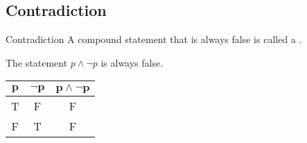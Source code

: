 \documentclass[\main/notes.tex]{subfiles}
\begin{document}
			\subsection{Contradiction}
				\begin{definition}[width=0.75\textwidth]{Contradiction}
					A compound statement that is always false is called a .
				\end{definition}
				\begin{example}[width=0.55\textwidth]
					The statement $p \land \lnot p$ is always false.
					\begin{center}
						\begin{tabular}{| c c | c |}
							\hline
							$\mathbf{p}$ & $\mathbf{\lnot p}$ & $\mathbf{p \land \lnot p}$\\
							\hline
							T & F & F\\
							F & T & F\\
							\hline
						\end{tabular}
					\end{center}
				\end{example}
\end{document}
